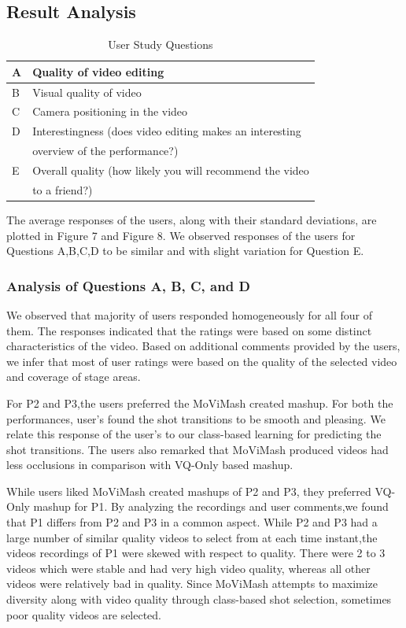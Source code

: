 \documentclass{sig-alternate}
\begin{document}
\subsection{Result Analysis}
\begin{table}
\centering
\caption{ User Study Questions }
\begin{tabular}{p{0.3cm}|p{8cm}} \hline
A& Quality of video editing\\ \hline
B&Visual quality of video\\ \hline
C& Camera positioning in the video\\ \hline
D& Interestingness (does video editing makes an interesting\\ 
& overview of the performance?)\\ \hline
E &Overall quality (how likely you will recommend the video \\
& to a friend?)\\ \hline
\end{tabular}
\end{table}

The average responses of the users, along with their standard deviations, are plotted in Figure 7 and Figure 8. We observed responses of the users for Questions A,B,C,D to be similar and with slight variation for Question E.

\subsubsection{ Analysis of Questions A, B, C, and D }
We observed that majority of users responded homogeneously for all four of them. The responses indicated that the ratings were based on some distinct characteristics of the video. Based on additional comments provided by the users, we infer that most of user ratings were based on the quality of the selected video and coverage of stage areas.

For P2 and P3,the users preferred the MoViMash created mashup. For both the performances, user’s found the shot transitions to be smooth and pleasing. We relate this response of the user’s to our class-based learning for predicting the shot transitions. The users also remarked that MoViMash produced videos had less occlusions in comparison with VQ-Only based mashup.

While users liked MoViMash created mashups of P2 and P3, they preferred VQ-Only mashup for P1. By analyzing the recordings and user comments,we found that P1 differs from P2 and P3 in a common aspect. While P2 and P3 had a large number of similar quality videos to select from at each time instant,the videos recordings of P1 were skewed with respect to quality. There were 2 to 3 videos which were stable and had very high video quality, whereas all other videos were relatively bad in quality. Since MoViMash attempts to maximize diversity along with video quality through class-based shot selection, sometimes poor quality videos are selected. 
\end{document}
